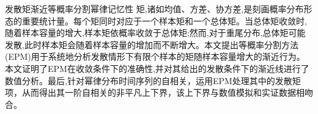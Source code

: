 
\begin{Cabstract}{发散矩}{渐近}{等概率分割}{幂律}{记忆性}
矩,诸如均值、方差、协方差,是刻画概率分布形态的重要统计量。每个矩同时对应于一个样本矩和一个总体矩。当总体矩收敛时,随着样本容量的增大,样本矩依概率收敛于总体矩;然而,对于重尾分布,总体矩可能发散,此时样本矩会随着样本容量的增加而不断增大。本文提出等概率分割方法(EPM)用于系统地分析发散情形下有限个样本的矩随样本容量增大的渐近行为。本文证明了EPM在收敛条件下的准确性,并对其给出的发散条件下的渐近线进行了数值分析。最后,针对幂律分布时间序列的自相关，运用EPM处理其中的发散矩项，从而得出其一阶自相关的非平凡上下界，该上下界与数值模拟和实证数据相吻合。
\end{Cabstract}